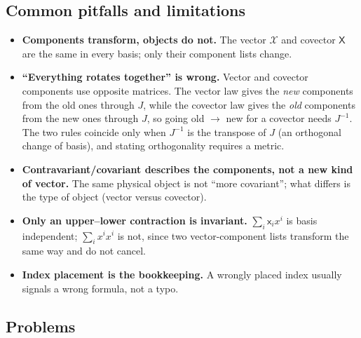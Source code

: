 \documentclass[11pt]{article}
\begin{document}
\subsection*{Common pitfalls and limitations}

\begin{itemize}
  \item \textbf{Components transform, objects do not.} The vector $\mathcal X$ and covector $\mathsf X$ are the same in every basis; only their component lists change.
  \item \textbf{``Everything rotates together'' is wrong.} Vector and covector components use opposite matrices. The vector law gives the \emph{new} components from the old ones through $J$, while the covector law gives the \emph{old} components from the new ones through $J$, so going old $\to$ new for a covector needs $J^{-1}$. The two rules coincide only when $J^{-1}$ is the transpose of $J$ (an orthogonal change of basis), and stating orthogonality requires a metric.
  \item \textbf{Contravariant/covariant describes the components, not a new kind of vector.} The same physical object is not ``more covariant''; what differs is the type of object (vector versus covector).
  \item \textbf{Only an upper--lower contraction is invariant.} $\sum_i\mathsf x_ix^i$ is basis independent; $\sum_ix^ix^i$ is not, since two vector-component lists transform the same way and do not cancel.
  \item \textbf{Index placement is the bookkeeping.} A wrongly placed index usually signals a wrong formula, not a typo.
\end{itemize}

\subsection*{Problems}
\end{document}
